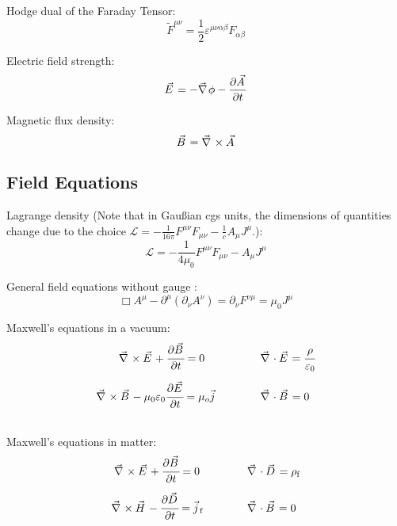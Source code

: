 		\noindent
		Hodge dual of the Faraday Tensor:
		\begin{equation}
			\tilde{F}^{\mu\nu} = \frac{1}{2}\varepsilon^{\mu\nu\alpha\beta}F_{\alpha\beta}
		\end{equation}

		\noindent
		Electric field strength:
		\begin{equation}
			\vec{E} = -\Nabla\phi-\pdv{\vec{A}}{t}
		\end{equation}

		\noindent
		Magnetic flux density:
		\begin{equation}
			\vec{B} = \Nabla\times\vec{A}
		\end{equation}


	\subsection{Field Equations}
		\noindent
		Lagrange density (Note that in Gaußian cgs units, the dimensions of quantities change due to the choice $\mathcal{L} = -\frac{1}{16\pi}F^{\mu\nu} F_{\mu\nu} - \frac{1}{c} A_\mu J^\mu$.):
		\begin{equation}
			\mathcal{L} = -\frac{1}{4\mu_0}F^{\mu\nu} F_{\mu\nu} - A_\mu J^\mu
		\end{equation}

		\noindent
		General field equations without gauge :
		\begin{equation}
			\Box A^\mu-\partial^\mu\left(\partial_\nu A^\nu\right) = \partial_\nu F^{\nu\mu} =  \mu_0 J^\mu
		\end{equation}

		\noindent
		Maxwell's equations in a vacuum:
		\begin{equation}
			\begin{array}{rl}
				\vec{\nabla}\times \vec{E} + \cfrac{\partial\vec{B}}{\partial t} = 0 \phantom{\mu_0}
				& \hsp \vec{\nabla}\cdot\vec{E} = \cfrac{\rho}{\varepsilon_0} \\ \xrowht{40pt}
				\vec{\nabla}\times\vec{B} - \mu_0 \varepsilon_0 \cfrac{\partial \vec{E}}{\partial t} = \mu_o\vec{j}
				& \hsp \vec{\nabla}\cdot\vec{B} = 0
			\end{array}
		\end{equation}

		\noindent
		Maxwell's equations in matter:
		\begin{equation}
			\begin{array}{rl}
				\vec{\nabla}\times \vec{E} + \cfrac{\partial\vec{B}}{\partial t} = 0 \phantom{_\text{f}}
				& \hsp \vec{\nabla}\cdot\vec{D} = \rho_\text{f} \\ \xrowht{40pt}
				\vec{\nabla}\times\vec{H} - \cfrac{\partial \vec{D}}{\partial t} = \vec{j}_\text{f}
				& \hsp \vec{\nabla}\cdot\vec{B} = 0
			\end{array}
		\end{equation}

